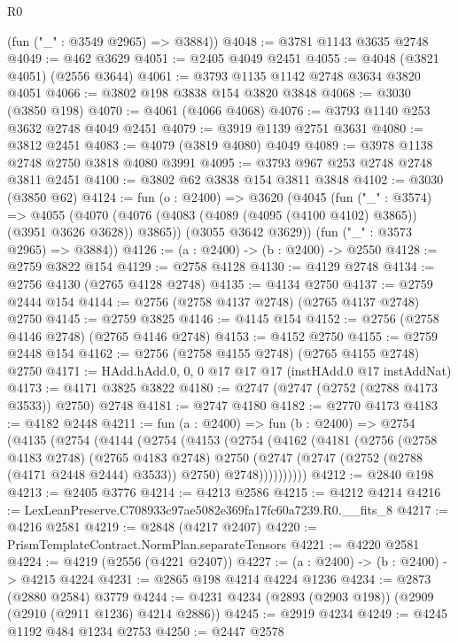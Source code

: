 \begin{lexlean}{R0}
\begin{coremodule}
      (fun ("_" : @3549 @2965) => @3884))
@4048 := @3781 @1143 @3635 @2748
@4049 := @462 @3629
@4051 := @2405 @4049 @2451
@4055 := @4048 (@3821 @4051) (@2556 @3644)
@4061 := @3793 @1135 @1142 @2748 @3634 @3820 @4051
@4066 := @3802 @198 @3838 @154 @3820 @3848
@4068 := @3030 (@3850 @198)
@4070 := @4061 (@4066 @4068)
@4076 := @3793 @1140 @253 @3632 @2748 @4049 @2451
@4079 := @3919 @1139 @2751 @3631
@4080 := @3812 @2451
@4083 := @4079 (@3819 @4080) @4049
@4089 := @3978 @1138 @2748 @2750 @3818 @4080 @3991
@4095 := @3793 @967 @253 @2748 @2748 @3811 @2451
@4100 := @3802 @62 @3838 @154 @3811 @3848
@4102 := @3030 (@3850 @62)
@4124 := fun (o : @2400) =>
  @3620
    (@4045
      (fun ("_" : @3574) =>
      @4055
        (@4070 (@4076 (@4083 (@4089 (@4095 (@4100 @4102) @3865)) (@3951 @3626 @3628)) @3865))
        (@3055 @3642 @3629))
      (fun ("_" : @3573 @2965) => @3884))
@4126 := (a : @2400) -> (b : @2400) -> @2550
@4128 := @2759 @3822 @154
@4129 := @2758 @4128
@4130 := @4129 @2748
@4134 := @2756 @4130 (@2765 @4128 @2748)
@4135 := @4134 @2750
@4137 := @2759 @2444 @154
@4144 := @2756 (@2758 @4137 @2748) (@2765 @4137 @2748) @2750
@4145 := @2759 @3825
@4146 := @4145 @154
@4152 := @2756 (@2758 @4146 @2748) (@2765 @4146 @2748)
@4153 := @4152 @2750
@4155 := @2759 @2448 @154
@4162 := @2756 (@2758 @4155 @2748) (@2765 @4155 @2748) @2750
@4171 := HAdd.hAdd.{0, 0, 0} @17 @17 @17 (instHAdd.{0} @17 instAddNat)
@4173 := @4171 @3825 @3822
@4180 := @2747 (@2747 (@2752 (@2788 @4173 @3533)) @2750) @2748
@4181 := @2747 @4180
@4182 := @2770 @4173
@4183 := @4182 @2448
@4211 := fun (a : @2400) =>
  fun (b : @2400) =>
  @2754
    (@4135
      (@2754
        (@4144
          (@2754
            (@4153
              (@2754
                (@4162
                  (@4181
                    (@2756
                      (@2758 @4183 @2748)
                      (@2765 @4183 @2748)
                      @2750
                      (@2747 (@2747 (@2752 (@2788 (@4171 @2448 @2444) @3533)) @2750) @2748))))))))))
@4212 := @2840 @198
@4213 := @2405 @3776
@4214 := @4213 @2586
@4215 := @4212 @4214
@4216 := LexLeanPreserve.C708933c97ae5082e369fa17fc60a7239.R0.__fits_8
@4217 := @4216 @2581
@4219 := @2848 (@4217 @2407)
@4220 := PrismTemplateContract.NormPlan.separateTensors
@4221 := @4220 @2581
@4224 := @4219 (@2556 (@4221 @2407))
@4227 := (a : @2400) -> (b : @2400) -> @4215 @4224
@4231 := @2865 @198 @4214 @4224 @1236
@4234 := @2873 (@2880 @2584) @3779
@4244 := @4231 @4234 (@2893 (@2903 @198)) (@2909 (@2910 (@2911 @1236) @4214 @2886))
@4245 := @2919 @4234
@4249 := @4245 @1192 @484 @1234 @2753
@4250 := @2447 @2578

\end{coremodule}
\end{lexlean}
